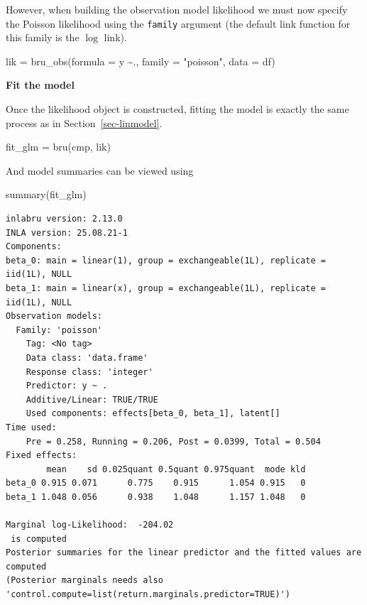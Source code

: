 \documentclass[
  letterpaper,
  DIV=11,
  numbers=noendperiod]{scrartcl}
\newenvironment{Shaded}{\begin{snugshade}}{\end{snugshade}}
\newcommand{\AttributeTok}[1]{\textcolor[rgb]{0.40,0.45,0.13}{#1}}
\newcommand{\FunctionTok}[1]{\textcolor[rgb]{0.28,0.35,0.67}{#1}}
\newcommand{\NormalTok}[1]{\textcolor[rgb]{0.00,0.23,0.31}{#1}}
\newcommand{\OtherTok}[1]{\textcolor[rgb]{0.00,0.23,0.31}{#1}}
\newcommand{\SpecialCharTok}[1]{\textcolor[rgb]{0.37,0.37,0.37}{#1}}
\newcommand{\StringTok}[1]{\textcolor[rgb]{0.13,0.47,0.30}{#1}}
\begin{document}
However, when building the observation model likelihood we must now
specify the Poisson likelihood using the \texttt{family} argument (the
default link function for this family is the \(\log\) link).

\begin{Shaded}
\begin{Highlighting}[]
\NormalTok{lik }\OtherTok{=}  \FunctionTok{bru\_obs}\NormalTok{(}\AttributeTok{formula =}\NormalTok{ y }\SpecialCharTok{\textasciitilde{}}\NormalTok{.,}
            \AttributeTok{family =} \StringTok{"poisson"}\NormalTok{,}
            \AttributeTok{data =}\NormalTok{ df)}
\end{Highlighting}
\end{Shaded}

\textbf{Fit the model}

Once the likelihood object is constructed, fitting the model is exactly
the same process as in Section~\ref{sec-linmodel}.

\begin{Shaded}
\begin{Highlighting}[]
\NormalTok{fit\_glm }\OtherTok{=} \FunctionTok{bru}\NormalTok{(cmp, lik)}
\end{Highlighting}
\end{Shaded}

And model summaries can be viewed using

\begin{Shaded}
\begin{Highlighting}[]
\FunctionTok{summary}\NormalTok{(fit\_glm)}
\end{Highlighting}
\end{Shaded}

\begin{verbatim}
inlabru version: 2.13.0
INLA version: 25.08.21-1
Components:
beta_0: main = linear(1), group = exchangeable(1L), replicate = iid(1L), NULL
beta_1: main = linear(x), group = exchangeable(1L), replicate = iid(1L), NULL
Observation models:
  Family: 'poisson'
    Tag: <No tag>
    Data class: 'data.frame'
    Response class: 'integer'
    Predictor: y ~ .
    Additive/Linear: TRUE/TRUE
    Used components: effects[beta_0, beta_1], latent[]
Time used:
    Pre = 0.258, Running = 0.206, Post = 0.0399, Total = 0.504 
Fixed effects:
        mean    sd 0.025quant 0.5quant 0.975quant  mode kld
beta_0 0.915 0.071      0.775    0.915      1.054 0.915   0
beta_1 1.048 0.056      0.938    1.048      1.157 1.048   0

Marginal log-Likelihood:  -204.02 
 is computed 
Posterior summaries for the linear predictor and the fitted values are computed
(Posterior marginals needs also 'control.compute=list(return.marginals.predictor=TRUE)')
\end{verbatim}
\end{document}
